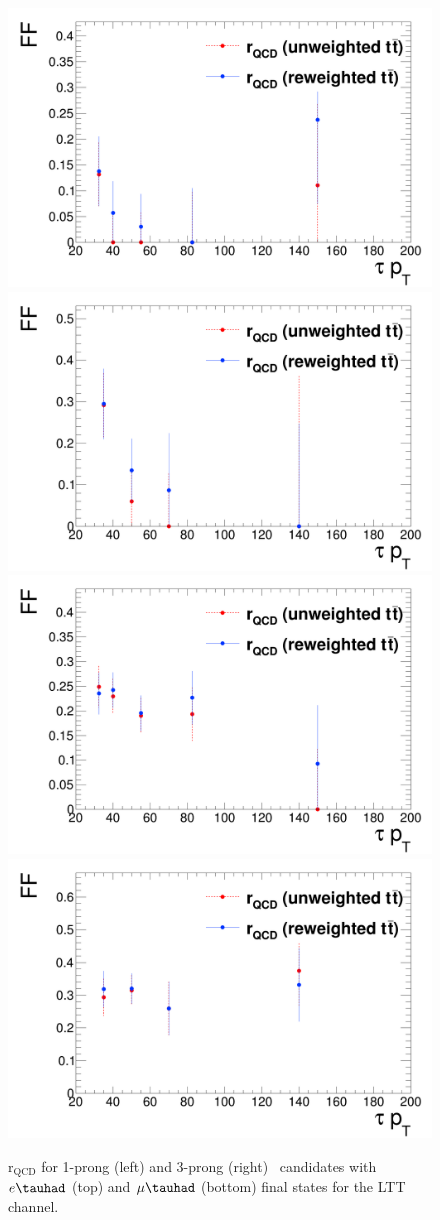 \begin{figure}[htbp]
\centering
\includegraphics[width=.48\textwidth]{DiHiggs/plots/FF_CRs/LTTElecrQCD1p.png}
\includegraphics[width=.48\textwidth]{DiHiggs/plots/FF_CRs/LTTElecrQCD3p.png} \\
\includegraphics[width=.48\textwidth]{DiHiggs/plots/FF_CRs/LTTMuonrQCD1p.png}
\includegraphics[width=.48\textwidth]{DiHiggs/plots/FF_CRs/LTTMuonrQCD3p.png}\\
\caption{$\mathrm{r}_{\mathrm{QCD}}$ for 1-prong (left) 
and 3-prong (right) \tauhad\ candidates with $e\tauhad$ 
 (top) and $\mu\tauhad$ (bottom) final states
for the LTT channel.}
\label{fig:LTT_rQCD}
\end{figure}
